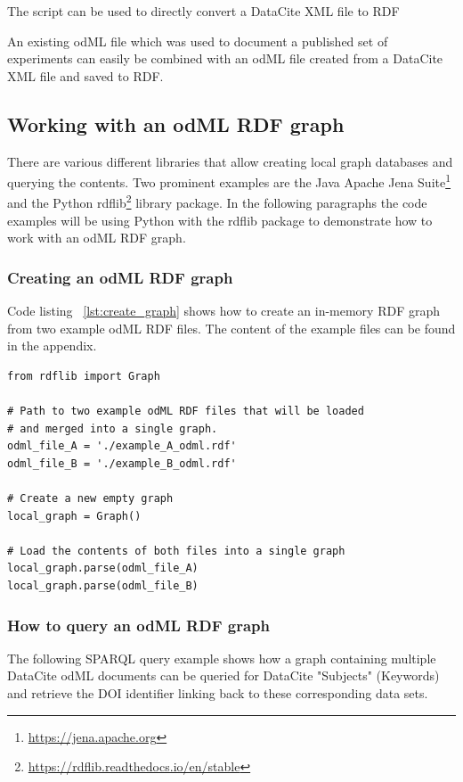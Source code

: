 \documentclass{article}
\begin{document}
The script can be used to directly convert a DataCite XML file to RDF

An existing odML file which was used to document a published set of experiments can easily be combined with an odML file created from a DataCite XML file and saved to RDF.

\subsection{Working with an odML RDF graph} \label{sec:rdf_usage}

There are various different libraries that allow creating local graph databases and querying the contents. Two prominent examples are the Java Apache Jena Suite\footnote{\url{https://jena.apache.org}} and the Python rdflib\footnote{\url{https://rdflib.readthedocs.io/en/stable}} library package. In the following paragraphs the code examples will be using Python with the rdflib package to demonstrate how to work with an odML RDF graph.

\subsubsection{Creating an odML RDF graph} \label{sec:rdf_graph_create}

Code listing ~\ref{lst:create_graph} shows how to create an in-memory RDF graph from two example odML RDF files. The content of the example files can be found in the appendix.

\begin{lstlisting}[label=lst:create_graph, caption=Create RDF graph, basicstyle=\small]
from rdflib import Graph

# Path to two example odML RDF files that will be loaded
# and merged into a single graph.
odml_file_A = './example_A_odml.rdf'
odml_file_B = './example_B_odml.rdf'

# Create a new empty graph
local_graph = Graph()

# Load the contents of both files into a single graph
local_graph.parse(odml_file_A)
local_graph.parse(odml_file_B)
\end{lstlisting}

\subsubsection{How to query an odML RDF graph} \label{sec:rdf_graph_query}
The following SPARQL query example shows how a graph containing multiple DataCite odML documents can be queried for DataCite "Subjects" (Keywords) and retrieve the DOI identifier linking back to these corresponding data sets.
\end{document}
